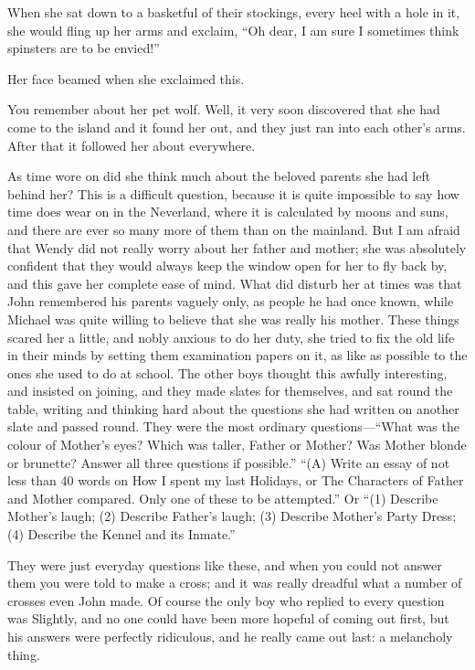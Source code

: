 When she sat down to a basketful of their stockings, every heel with a
hole in it, she would fling up her arms and exclaim, ``Oh dear, I am
sure I sometimes think spinsters are to be envied!''

Her face beamed when she exclaimed this.

You remember about her pet wolf. Well, it very soon discovered that she
had come to the island and it found her out, and they just ran into
each other's arms. After that it followed her about everywhere.

As time wore on did she think much about the beloved parents she had
left behind her? This is a difficult question, because it is quite
impossible to say how time does wear on in the Neverland, where it is
calculated by moons and suns, and there are ever so many more of them
than on the mainland. But I am afraid that Wendy did not really worry
about her father and mother; she was absolutely confident that they
would always keep the window open for her to fly back by, and this gave
her complete ease of mind. What did disturb her at times was that John
remembered his parents vaguely only, as people he had once known, while
Michael was quite willing to believe that she was really his mother.
These things scared her a little, and nobly anxious to do her duty, she
tried to fix the old life in their minds by setting them examination
papers on it, as like as possible to the ones she used to do at school.
The other boys thought this awfully interesting, and insisted on
joining, and they made slates for themselves, and sat round the table,
writing and thinking hard about the questions she had written on
another slate and passed round. They were the most ordinary
questions---``What was the colour of Mother's eyes? Which was taller,
Father or Mother? Was Mother blonde or brunette? Answer all three
questions if possible.'' ``(A) Write an essay of not less than 40 words
on How I spent my last Holidays, or The Characters of Father and Mother
compared. Only one of these to be attempted.'' Or ``(1) Describe Mother's
laugh; (2) Describe Father's laugh; (3) Describe Mother's Party Dress;
(4) Describe the Kennel and its Inmate.''

They were just everyday questions like these, and when you could not
answer them you were told to make a cross; and it was really dreadful
what a number of crosses even John made. Of course the only boy who
replied to every question was Slightly, and no one could have been more
hopeful of coming out first, but his answers were perfectly ridiculous,
and he really came out last: a melancholy thing.

